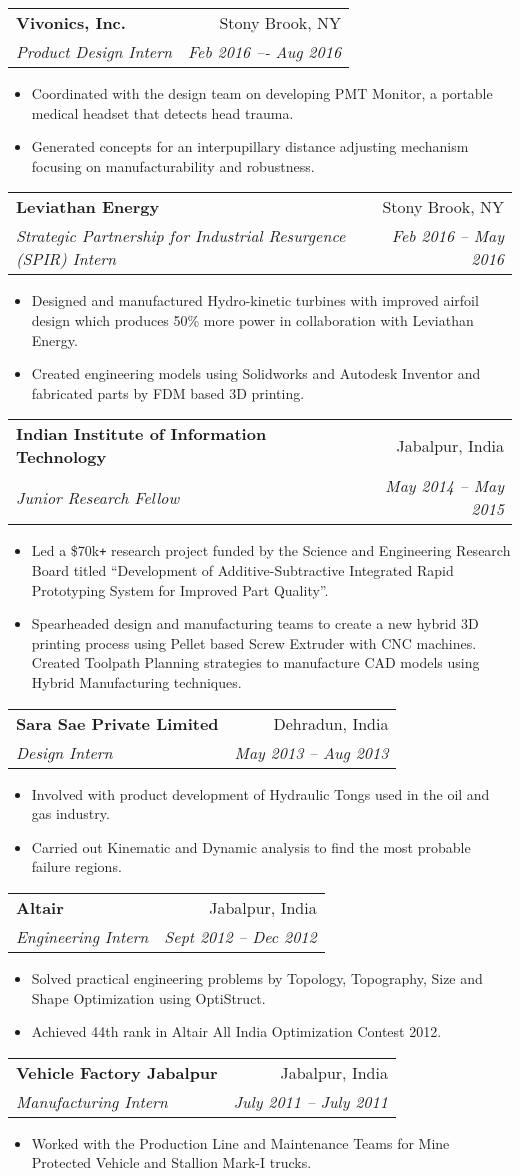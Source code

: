 \documentclass[letterpaper,10pt]{article}
\makeatletter
\newcommand{\resumeHeading}[4]{
  \vspace{-1pt}
    \begin{tabular*}{0.97\textwidth}{l@{\extracolsep{\fill}}r}
      \textbf{#1} & #2 \vspace{-2pt}\\ \vspace{1pt}
      \textit{\small#3} & \textit{\small #4} \\
    \end{tabular*}
}
\newcommand{\resumeItemListStart}{
\vspace{-7pt}
\begin{itemize}[leftmargin=14pt]
}
\newcommand{\resumeItemListEnd}{
\vspace{+7pt}
\end{itemize}
}
\newcommand{\resumeItem}[1]{
  \item\small{
      {#1 \vspace{-7pt}
      }
  }
}
\makeatother
\begin{document}
\resumeHeading
{Vivonics, Inc.}{Stony Brook, NY}
{Product Design Intern}{Feb 2016 –- Aug 2016}
\resumeItemListStart
\resumeItem{Coordinated with the design team on developing PMT Monitor, a portable medical headset that detects head trauma.}
\resumeItem{Generated concepts for an interpupillary distance adjusting mechanism focusing on manufacturability and robustness.}
\resumeItemListEnd

\resumeHeading
{Leviathan Energy}{Stony Brook, NY}
{Strategic Partnership for Industrial Resurgence (SPIR) Intern}{Feb 2016 – May 2016}
\resumeItemListStart
\resumeItem{Designed and manufactured Hydro-kinetic turbines with improved airfoil design which produces 50\% more power in collaboration with Leviathan Energy.}
\resumeItem{Created engineering models using Solidworks and Autodesk Inventor and fabricated parts by FDM based 3D printing.}
\resumeItemListEnd

\resumeHeading
{Indian Institute of Information Technology}{Jabalpur, India}
{Junior Research Fellow}{May 2014 -- May 2015}
\resumeItemListStart
\resumeItem{Led a \$70k\texttt{+} research project funded by the Science and Engineering Research Board titled “Development of Additive-Subtractive Integrated Rapid Prototyping System for Improved Part Quality”.}
\resumeItem{Spearheaded design and manufacturing teams to create a new hybrid 3D printing process using Pellet based Screw Extruder with CNC machines. Created Toolpath Planning strategies to manufacture CAD models using Hybrid Manufacturing techniques.}
\resumeItemListEnd

\resumeHeading
{Sara Sae Private Limited}{Dehradun, India}
{Design Intern}{May 2013 -- Aug 2013}
\resumeItemListStart
\resumeItem{Involved with product development of Hydraulic Tongs used in the oil and gas industry.}
\resumeItem{Carried out Kinematic and Dynamic analysis to find the most probable failure regions.}
\resumeItemListEnd

\resumeHeading
{Altair}{Jabalpur, India}
{Engineering Intern}{Sept 2012 -- Dec 2012}
\resumeItemListStart
\resumeItem{Solved practical engineering problems by Topology, Topography, Size and Shape Optimization using OptiStruct. }
\resumeItem{Achieved 44th rank in Altair All India Optimization Contest 2012.}
\resumeItemListEnd

\resumeHeading
{Vehicle Factory Jabalpur}{Jabalpur, India}
{Manufacturing Intern}{July 2011 -- July 2011}
\resumeItemListStart
\resumeItem{Worked with the Production Line and Maintenance Teams for Mine Protected Vehicle and Stallion Mark-I trucks.}
\resumeItemListEnd
\end{document}
